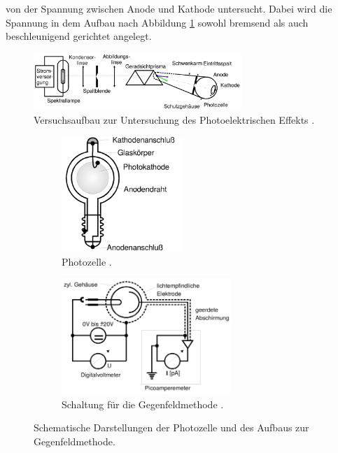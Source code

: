 von der Spannung zwischen Anode und Kathode untersucht. Dabei wird die Spannung in dem Aufbau nach Abbildung \ref{fig: aufbau}
sowohl bremsend als auch beschleunigend gerichtet angelegt.
\begin{figure}
  \centering
  \includegraphics[width = 0.7\textwidth]{pics/aufbau.png}
  \caption{Versuchsaufbau zur Untersuchung des Photoelektrischen Effekts \cite{anleitung500}.}
  \label{fig: aufbau}
\end{figure}
\begin{figure}
  \centering
  \begin{subfigure}{0.48\textwidth}
    \centering
    \includegraphics[width = 0.5\textwidth]{pics/photozelle.png}
    \caption{Photozelle \cite{anleitung500}.}
    \label{fig: photozelle}
  \end{subfigure}
  \begin{subfigure}{0.48\textwidth}
    \centering
    \includegraphics[width = 0.7\textwidth]{pics/schaltplan.png}
    \caption{Schaltung für die Gegenfeldmethode \cite{anleitung500}.}
    \label{fig: schaltplan}
  \end{subfigure}
  \caption{Schematische Darstellungen der Photozelle und des Aufbaus zur Gegenfeldmethode.}
\end{figure}
